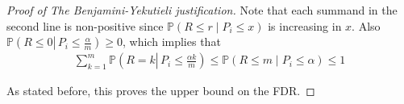 \begin{proof}[Proof of The Benjamini-Yekutieli justification]
Note that each summand in the second line is non-positive since $\mathbb{P}\left(R \leq r \mid P_i \leq x\right)$ is increasing in $x$. Also $\mathbb{P}\left(R \leq 0 \left\lvert\, P_i \leq \frac{\alpha}{m}\right.\right) \geq 0$, which implies that
\begin{align*}
\sum_{k=1}^m \mathbb{P}\left(R=k \left\lvert\, P_i \leq \frac{\alpha k}{m}\right.\right) \leq \mathbb{P}\left(R \leq m \mid P_i \leq \alpha\right) \leq 1
\end{align*}


As stated before, this proves the upper bound on the FDR.
\end{proof}